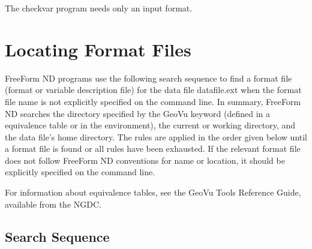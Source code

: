 
The checkvar program needs only an input format. 

\section{Locating Format Files}
\label{ff,convs,locating}

FreeForm ND programs use the following search sequence to find a
format file (format or variable description file) for the data file
datafile.ext when the format file name is not explicitly specified on
the command line. In summary, FreeForm ND searches the directory
specified by the GeoVu keyword  (defined in a equivalence
table or in the environment), the current or working directory, and
the data file's home directory. The rules are applied in the order
given below until a format file is found or all rules have been
exhausted. If the relevant format file does not follow FreeForm ND
conventions for name or location, it should be explicitly specified on
the command line.


For information about equivalence tables, see the GeoVu Tools
Reference Guide, available from the NGDC.

\subsection{Search Sequence}

